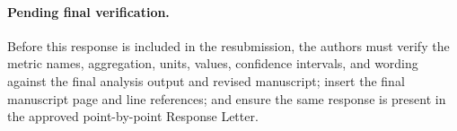 \documentclass[11pt]{article}
\begin{document}
\paragraph{Pending final verification.}
Before this response is included in the resubmission, the authors must verify
the metric names, aggregation, units, values, confidence intervals, and
wording against the final analysis output and revised manuscript; insert the
final manuscript page and line references; and ensure the same response is
present in the approved point-by-point Response Letter.
\end{document}
